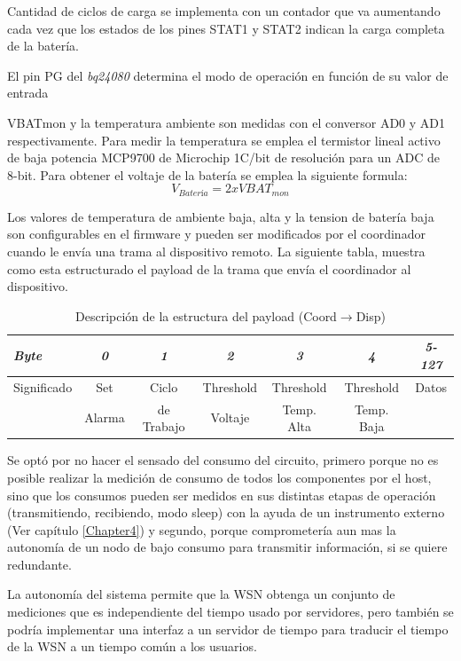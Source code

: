 {Cantidad de ciclos de carga se implementa con un contador que va aumentando cada vez que los estados de los pines STAT1 y STAT2 indican la carga completa de la batería.

El pin PG del \textit{bq24080} determina el modo de operación en función de su valor de entrada

VBATmon y la temperatura ambiente son medidas con el conversor AD0 y AD1 respectivamente. Para medir la temperatura se emplea el termistor lineal activo de baja potencia MCP9700 de Microchip \citep{termis} 1\grados C/bit de resolución para un ADC de 8-bit. Para obtener el voltaje de la batería se emplea la siguiente formula: \[V_{Batería}=2xVBAT_{mon}\]

Los valores de temperatura de ambiente baja, alta y la tension de batería baja son configurables en el firmware y pueden ser modificados por el coordinador cuando le envía una trama al dispositivo remoto. La siguiente tabla, muestra como esta estructurado el payload de la trama que envía el coordinador al dispositivo.

\begin{table}[ht]
	\centering
	\caption{Descripción de la estructura del payload (Coord$\rightarrow$Disp)}
	\begin{tabular}{@{} l *6c @{}}    \toprule
		\emph{\textbf{Byte}} & \emph{\textbf{0}} & \emph{\textbf{1}} & \emph{\textbf{2}} & \emph{\textbf{3}} & \emph{\textbf{4}} & \emph{\textbf{5-127}}\\
		\midrule
		Significado & Set & Ciclo & Threshold & Threshold & Threshold & Datos\\
		 & Alarma & de Trabajo & Voltaje & Temp. Alta & Temp. Baja & \\
		\bottomrule
		\hline
	\end{tabular}
	\label{tab:STAT}
\end{table}

Se optó por no hacer el sensado del consumo del circuito, primero porque no es posible realizar la medición de consumo de todos los componentes por el host, sino que los consumos pueden ser medidos en sus distintas etapas de operación (transmitiendo, recibiendo, modo sleep) con la ayuda de un instrumento externo (Ver capítulo \ref{Chapter4}) y segundo, porque comprometería aun mas la autonomía de un nodo de bajo consumo para transmitir información, si se quiere redundante.

La autonomía del sistema permite que la WSN obtenga un conjunto de mediciones que es independiente del tiempo usado por servidores, pero también se podría implementar una interfaz a un servidor de tiempo para traducir el tiempo de la WSN a un tiempo común a los usuarios.

}
